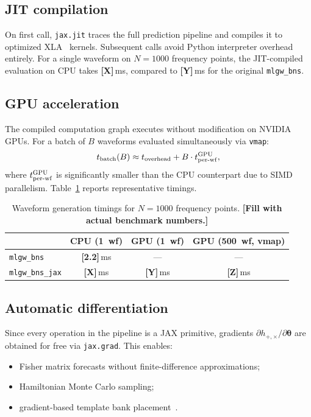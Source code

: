 \documentclass[twocolumn,superscriptaddress,nofootinbib,aps,prd]{revtex4-2}
\newcommand{\tbd}[1]{{\color{red}\textbf{[#1]}}}
\begin{document}
\subsection{JIT compilation}

On first call, \texttt{jax.jit} traces the full prediction pipeline and
compiles it to optimized XLA~\cite{XLA} kernels.  Subsequent calls avoid
Python interpreter overhead entirely.  For a single waveform on $N = 1000$
frequency points, the JIT-compiled evaluation on CPU takes
\tbd{X}\,ms, compared to \tbd{Y}\,ms for the original
\texttt{mlgw\_bns}.

\subsection{GPU acceleration}

The compiled computation graph executes without modification on NVIDIA GPUs.
For a batch of $B$ waveforms evaluated simultaneously via \texttt{vmap}:
\begin{equation}
    t_{\rm batch}(B) \approx t_{\rm overhead} + B \cdot t_{\rm per\text{-}wf}^{\rm GPU},
\end{equation}
where $t_{\rm per\text{-}wf}^{\rm GPU}$ is significantly smaller than the CPU
counterpart due to SIMD parallelism.  Table~\ref{tab:speed} reports
representative timings.

\begin{table}[t]
\caption{Waveform generation timings for $N=1000$ frequency points.
\tbd{Fill with actual benchmark numbers.}}
\label{tab:speed}
\begin{ruledtabular}
\begin{tabular}{lccc}
 & CPU (1~wf) & GPU (1~wf) & GPU (500~wf, vmap) \\
\hline
\texttt{mlgw\_bns} & \tbd{2.2}\,ms & --- & --- \\
\texttt{mlgw\_bns\_jax} & \tbd{X}\,ms & \tbd{Y}\,ms & \tbd{Z}\,ms \\
\end{tabular}
\end{ruledtabular}
\end{table}

\subsection{Automatic differentiation}

Since every operation in the pipeline is a JAX primitive, gradients
$\partial h_{+,\times}/\partial\bm{\theta}$ are obtained for free via
\texttt{jax.grad}.  This enables:
\begin{itemize}
    \item Fisher matrix forecasts without finite-difference approximations;
    \item Hamiltonian Monte Carlo sampling;
    \item gradient-based template bank placement~\cite{Coogan:2022}.
\end{itemize}
\end{document}
